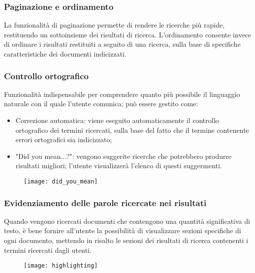 			\subsubsection{Paginazione e ordinamento}
			La funzionalità di paginazione permette di rendere le ricerche più rapide, restituendo un sottoinsieme dei risultati di ricerca.
			L'ordinamento consente invece di ordinare i risultati restituiti a seguito di una ricerca, sulla base di specifiche caratteristiche dei documenti indicizzati.
			
			\subsubsection{Controllo ortografico}
			Funzionalità indispensabile per comprendere quanto più possibile il linguaggio naturale con il quale l'utente comunica; può essere gestito come:
			\begin{itemize}
				\item {Correzione automatica: viene eseguito automaticamente il controllo ortografico dei termini ricercati, sulla base del fatto che il termine contenente errori ortografici sia indicizzato;}
				\item {"Did you mean...?": vengono suggerite ricerche che potrebbero produrre risultati migliori; l'utente visualizzerà l'elenco di questi suggermenti.}
			\end{itemize}

			\begin{figure}[htbp]
				\begin{center}
					\texttt{[image: did\_you\_mean]}
				\end{center}
			\end{figure}

			\subsubsection{Evidenziamento delle parole ricercate nei risultati}
			Quando vengono ricercati documenti che contengono una quantità significativa di testo, è bene fornire all'utente la possibilità di visualizzare sezioni specifiche di ogni documento, mettendo in risalto le sezioni dei risultati di ricerca contenenti i termini ricercati dagli utenti.
			
			\begin{figure}[htbp]
				\begin{center}
					\texttt{[image: highlighting]}
				\end{center}
			\end{figure}
		
